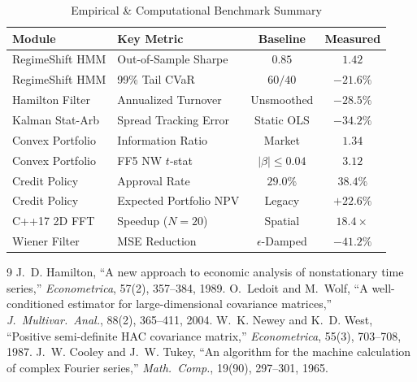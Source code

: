 \documentclass[10pt,a4paper,twocolumn]{article}
\begin{document}
\begin{table}[h!]
\centering
\scriptsize
\caption{Empirical \& Computational Benchmark Summary}
\label{tab:summary}
\vspace{2pt}
\begin{tabular}{@{}llcc@{}}
\toprule
\textbf{Module} & \textbf{Key Metric} & \textbf{Baseline} & \textbf{Measured} \\
\midrule
RegimeShift HMM & Out-of-Sample Sharpe & $0.85$ & $\mathbf{1.42}$ \\
RegimeShift HMM & 99\% Tail CVaR & $60/40$ & $\mathbf{-21.6\%}$ \\
Hamilton Filter & Annualized Turnover & Unsmoothed & $\mathbf{-28.5\%}$ \\
Kalman Stat-Arb & Spread Tracking Error & Static OLS & $\mathbf{-34.2\%}$ \\
Convex Portfolio & Information Ratio & Market & $\mathbf{1.34}$ \\
Convex Portfolio & FF5 NW $t$-stat & $|\beta| \le 0.04$ & $\mathbf{3.12}$ \\
Credit Policy & Approval Rate & $29.0\%$ & $\mathbf{38.4\%}$ \\
Credit Policy & Expected Portfolio NPV & Legacy & $\mathbf{+22.6\%}$ \\
C++17 2D FFT & Speedup ($N=20$) & Spatial & $\mathbf{18.4\times}$ \\
Wiener Filter & MSE Reduction & $\epsilon$-Damped & $\mathbf{-41.2\%}$ \\
\bottomrule
\end{tabular}
\end{table}

\footnotesize
\begin{thebibliography}{9}
\setlength{\itemsep}{0pt}
 J.~D. Hamilton, ``A new approach to economic analysis of nonstationary time series,'' \textit{Econometrica}, 57(2), 357--384, 1989.
 O.~Ledoit and M.~Wolf, ``A well-conditioned estimator for large-dimensional covariance matrices,'' \textit{J.\ Multivar.\ Anal.}, 88(2), 365--411, 2004.
 W.~K. Newey and K.~D. West, ``Positive semi-definite HAC covariance matrix,'' \textit{Econometrica}, 55(3), 703--708, 1987.
 J.~W. Cooley and J.~W. Tukey, ``An algorithm for the machine calculation of complex Fourier series,'' \textit{Math.\ Comp.}, 19(90), 297--301, 1965.
\end{thebibliography}
\end{document}
